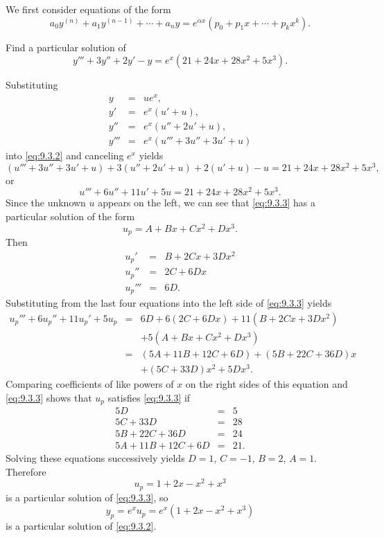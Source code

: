 \documentclass{ximera}
\begin{document}
We  first consider  equations of the form
$$
a_0y^{(n)}+a_1y^{(n-1)}+\cdots+a_ny=e^{\alpha
x}\left(p_0+p_1x+\cdots+p_kx^k\right).
$$

\begin{example}\label{example:9.3.1}
Find a particular solution of
\begin{equation} \label{eq:9.3.2}
y'''+3y''+2y'-y=e^x(21+24x+28x^2+5x^3).
\end{equation}


\begin{explanation} Substituting
\begin{eqnarray*}
y&=&ue^x,\\ y'&=&e^x(u'+u),\\
y''&=&e^x(u''+2u'+u),\\
y'''&=&e^x(u'''+3u''+3u'+u)
\end{eqnarray*}
into \eqref{eq:9.3.2} and canceling $e^x$ yields
$$
(u'''+3u''+3u'+u)+3(u''+2u'+u)+2(u'+u)-u
=21+24x+28x^2+5x^3,
$$
or
\begin{equation} \label{eq:9.3.3}
u'''+6u''+11u'+5u=21+24x+28x^2+5x^3.
\end{equation}
Since the unknown $u$ appears on the left, we can see that
\eqref{eq:9.3.3} has a particular solution of the form
$$
u_p=A+Bx+Cx^2+Dx^3.
$$
Then
\begin{eqnarray*}
u_p'&=&B+2Cx+3Dx^2\\
u_p''&=&2C+6Dx\\
u_p'''&=&6D.
\end{eqnarray*}
Substituting from the last four equations  into the left side of
\eqref{eq:9.3.3} yields
\begin{eqnarray*}
u_p'''+6u_p''+11u_p'+5u_p&=&6D+6(2C+6Dx)+11(B+2Cx+3Dx^2)\\
&&+5(A+Bx+Cx^2+Dx^3)\\
&=&(5A+11B+12C+6D)+(5B+22C+36D)x\\&&+(5C+33D)x^2+5Dx^3.
\end{eqnarray*}
Comparing coefficients of like powers of $x$ on the right sides of
this equation and \eqref{eq:9.3.3} shows that $u_p$ satisfies \eqref{eq:9.3.3}
if
$$
\begin{array}{rcr}
5D&=&5\\
5C+33D&=&28\\
5B+22C+36D&=&24\\
5A+11B+12C+6D&=&21.
\end{array}
$$
Solving these equations successively yields $D=1$, $C=-1$, $B=2$, $A=1$.
Therefore
$$
u_p=1+2x-x^2+x^3
$$
is a particular solution of  \eqref{eq:9.3.3}, so
$$
y_p=e^xu_p=e^x(1+2x-x^2+x^3)
$$
is a particular solution of  \eqref{eq:9.3.2}.



\end{explanation}
\end{example}
\end{document}
